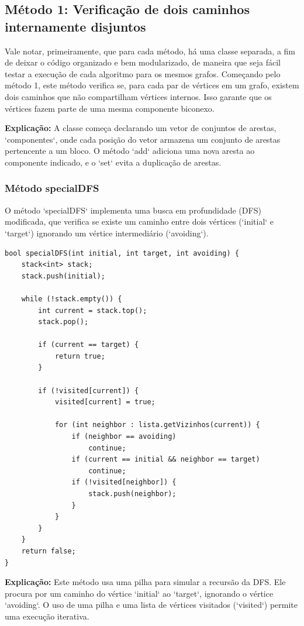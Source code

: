 \documentclass[10pt,conference]{IEEEtran}
\begin{document}
\newpage

\subsection{Método 1: Verificação de dois caminhos internamente disjuntos}
Vale notar, primeiramente, que para cada método, há uma classe separada, a fim de deixar o código organizado e bem modularizado, de maneira que seja fácil testar a execução de cada algoritmo para os mesmos grafos. Começando pelo método 1, este método verifica se, para cada par de vértices em um grafo, existem dois caminhos que não compartilham vértices internos. Isso garante que os vértices fazem parte de uma mesma componente biconexo.

\textbf{Explicação:} A classe começa declarando um vetor de conjuntos de arestas, `componentes`, onde cada posição do vetor armazena um conjunto de arestas pertencente a um bloco. O método `add` adiciona uma nova aresta ao componente indicado, e o `set` evita a duplicação de arestas.

\subsubsection{Método specialDFS}

O método `specialDFS` implementa uma busca em profundidade (DFS) modificada, que verifica se existe um caminho entre dois vértices (`initial` e `target`) ignorando um vértice intermediário (`avoiding`).

\begin{lstlisting}
bool specialDFS(int initial, int target, int avoiding) {
    stack<int> stack;
    stack.push(initial);

    while (!stack.empty()) {
        int current = stack.top();
        stack.pop();

        if (current == target) {
            return true;
        }

        if (!visited[current]) {
            visited[current] = true;

            for (int neighbor : lista.getVizinhos(current)) {
                if (neighbor == avoiding)
                    continue;
                if (current == initial && neighbor == target)
                    continue;
                if (!visited[neighbor]) {
                    stack.push(neighbor);
                }
            }
        }
    }
    return false;
}
\end{lstlisting}

\textbf{Explicação:} Este método usa uma pilha para simular a recursão da DFS. Ele procura por um caminho do vértice `initial` ao `target`, ignorando o vértice `avoiding`. O uso de uma pilha e uma lista de vértices visitados (`visited`) permite uma execução iterativa.
\end{document}
